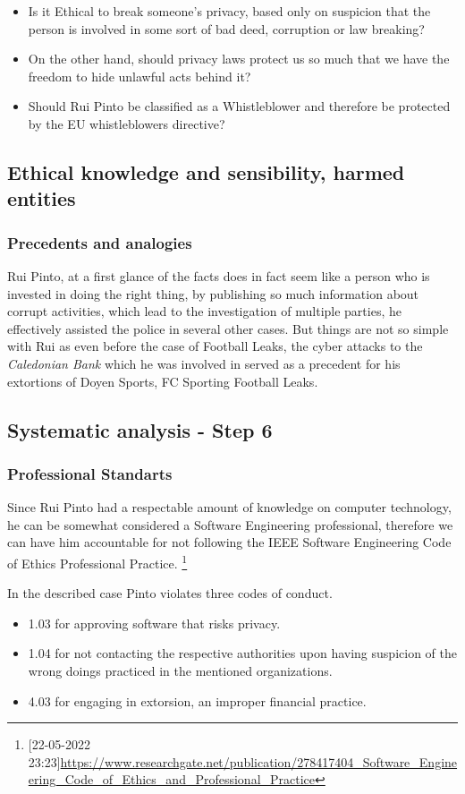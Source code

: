 \begin{itemize}
    \item Is it Ethical to break someone's privacy, based only on suspicion that the person is involved in some sort of bad deed, corruption or law breaking?
    \item On the other hand, should privacy laws protect us so much that we have the freedom to hide unlawful acts behind it?
    \item Should Rui Pinto be classified as a Whistleblower and therefore be protected by the EU whistleblowers directive?
\end{itemize}

\subsection{Ethical knowledge and sensibility, harmed entities}
\subsubsection{Precedents and analogies}
Rui Pinto, at a first glance of the facts does in fact seem like a person who is invested in doing the right thing, by publishing so much information about corrupt activities, which lead to the investigation of multiple parties, he effectively assisted the police in several other cases.
But things are not so simple with Rui as even before the case of Football Leaks, the cyber attacks to the \textit{Caledonian Bank} which he was involved in served as a precedent for his extortions of Doyen Sports, FC Sporting  Football Leaks.

\subsection{Systematic analysis - Step 6}

\subsubsection{Professional Standarts}
Since Rui Pinto had a respectable amount of knowledge on computer technology, he can be somewhat considered a Software Engineering professional, therefore we can have him accountable for not following the IEEE Software Engineering Code of Ethics Professional Practice.
\footnote{[22-05-2022 23:23]\url{https://www.researchgate.net/publication/278417404_Software_Engineering_Code_of_Ethics_and_Professional_Practice}}

In the described case Pinto violates three codes of conduct.
\begin{itemize}
    \item 1.03 for approving software that risks privacy.
    \item 1.04 for not contacting the respective authorities upon having suspicion of the wrong doings practiced in the mentioned organizations.
    \item 4.03 for engaging in extorsion, an improper financial practice.
\end{itemize}



